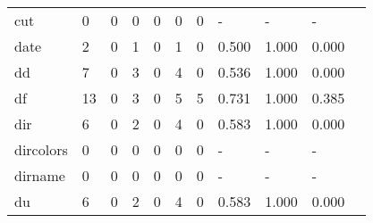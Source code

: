 \begin{longtable}{lp{1.10cm}p{1.10cm}p{1.10cm}p{1.10cm}p{1.10cm}p{1.10cm}p{1.10cm}p{1.10cm}p{1.10cm}p{1.10cm}}
cut       &                      0 &                                  0 &                                 0 &                                0 &                                 0 &                               0 &                              - &                                     - &                                   - \\
date      &                      2 &                                  0 &                                 1 &                                0 &                                 1 &                               0 &                          0.500 &                                 1.000 &                               0.000 \\
dd        &                      7 &                                  0 &                                 3 &                                0 &                                 4 &                               0 &                          0.536 &                                 1.000 &                               0.000 \\
df        &                     13 &                                  0 &                                 3 &                                0 &                                 5 &                               5 &                          0.731 &                                 1.000 &                               0.385 \\
dir       &                      6 &                                  0 &                                 2 &                                0 &                                 4 &                               0 &                          0.583 &                                 1.000 &                               0.000 \\
dircolors &                      0 &                                  0 &                                 0 &                                0 &                                 0 &                               0 &                              - &                                     - &                                   - \\
dirname   &                      0 &                                  0 &                                 0 &                                0 &                                 0 &                               0 &                              - &                                     - &                                   - \\
du        &                      6 &                                  0 &                                 2 &                                0 &                                 4 &                               0 &                          0.583 &                                 1.000 &                               0.000 \\

\end{longtable}
